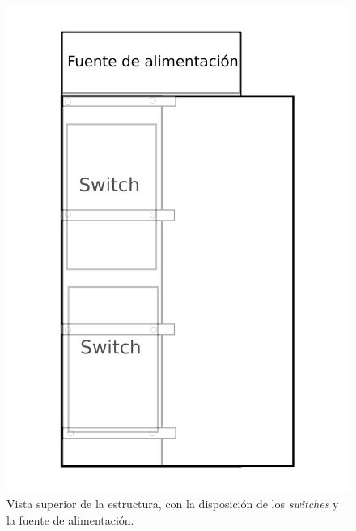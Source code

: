 \documentclass{article}
\begin{document}
\begin{figure}[H]
\centering
\includegraphics[height=0.7\textheight]{planos/base}
\caption{Vista superior de la estructura, con la disposición de los \textit{switches} y la fuente de alimentación.}
\end{figure}
\end{document}
